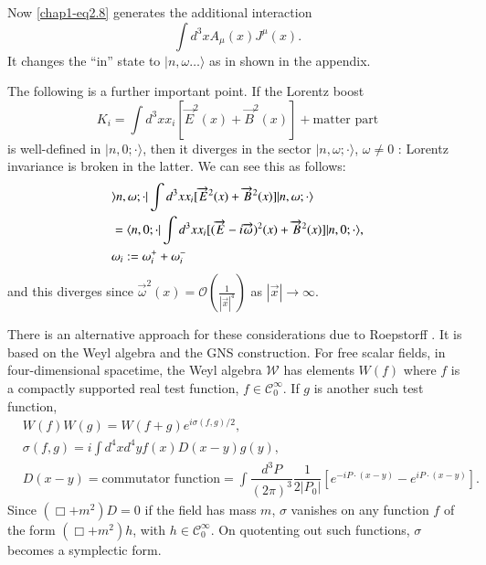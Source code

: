 Now \eqref{chap1-eq2.8} generates the additional interaction
\begin{equation}
\int d^{3}xA_{\mu}(x)J^{\mu}(x).\label{chap1-eq2.10}
\end{equation}
It changes the ``in'' state to $|n,\omega\ldots\rangle$ as in shown in the appendix.

The following is a further important point. If the Lorentz boost
\begin{equation}
K_{i}=\int d^{3}xx_{i}[\overrightarrow{E}^{2}(x)+\overrightarrow{B}^{2}(x)]+\text{matter part}\label{chap1-eq2.11}
\end{equation}
is well-defined in $|n, 0;\cdot\rangle$, then it diverges in the sector $|n,\omega;\cdot \rangle$, $\omega\neq 0$ : Lorentz invariance is broken in the latter. We can see this as follows:
\begin{align}
& \rangle n,\omega;\cdot | \int d^{3}xx_{i}[\overrightarrow{E}^{2}(x)+\overrightarrow{B}^{2}(x)]|n,\omega;\cdot\rangle\notag\\
& =\langle n,0;\cdot |\int d^{3}xx_{i}[(\overrightarrow{E}-i\overrightarrow{\omega})^{2}(x)+\overrightarrow{B}^{2}(x)]|n,0;\cdot\rangle,\notag\\
&\omega_{i} := \omega^{+}_{i}+\omega^{-}_{i}\label{chap1-eq2.12}
\end{align}
and this diverges since $\overrightarrow{\omega}^{2}(x)=\mathcal{O}(\frac{1}{|\overrightarrow{x}|^{4}})$ as $|\overrightarrow{x}|\to \infty$.

There is an alternative approach for these considerations due to Roepstorff \cite{key6}. It is based on the Weyl algebra and the GNS construction. For free scalar fields, in four-dimensional spacetime, the Weyl algebra $\mathcal{W}$ has elements $W(f)$ where $f$ is a compactly supported real test function, $f\in \mathcal{C}^{\infty}_{0}$. If $g$ is another such test function,
\begin{align}
& W(f)W(g)=W(f+g)e^{i\sigma(f,g)/2},\label{chap1-eq2.13}\\
& \sigma (f,g)=i \int d^{4}xd^{4}yf(x)D(x-y)g(y),\label{chap1-eq2.14}\\
& D(x-y)=\text{commutator function} = \int \dfrac{d^{3}P}{(2\pi)^{3}}\dfrac{1}{2|P_{0}|}[e^{-iP\cdot (x-y)}-e^{iP\cdot (x-y)}].\label{chap1-eq2.15}
\end{align}
Since $(\Box + m^2)D = 0$ if the field has mass $m$, $\sigma$ vanishes on any function $f$ of the form $(\Box + m^2)h$, with $h\in \mathcal{C}^{\infty}_{0}$. On quotenting out such functions, $\sigma$ becomes a symplectic form.

